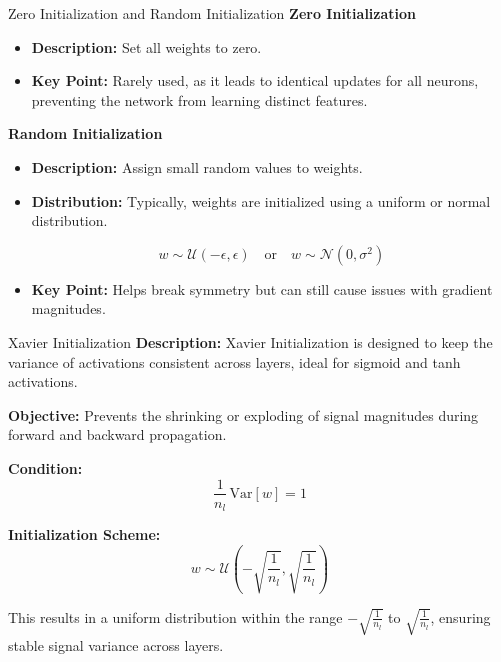 \documentclass[serif, aspectratio=169]{beamer}
\begin{document}
\begin{frame}{Zero Initialization and Random Initialization}
\textbf{Zero Initialization}
\begin{itemize}
     

   \item \textbf{Description:} Set all weights to zero.
    
   \item \textbf{Key Point:} Rarely used, as it leads to identical updates for all neurons, preventing the network from learning distinct features.
    \end{itemize}
    \textbf{Random Initialization}
\begin{itemize}
   \item \textbf{Description:} Assign small random values to weights.
    
    \item \textbf{Distribution:} Typically, weights are initialized using a uniform or normal distribution.
    
    \[
    w \sim \mathcal{U}(-\epsilon, \epsilon) \quad \text{or} \quad w \sim \mathcal{N}(0, \sigma^2)
    \]
    
   \item \textbf{Key Point:} Helps break symmetry but can still cause issues with gradient magnitudes.
   \end{itemize}
   
\end{frame}
\begin{frame}{Xavier Initialization}
    \textbf{Description:} 
    Xavier Initialization is designed to keep the variance of activations consistent across layers, ideal for sigmoid and tanh activations.

    \textbf{Objective:} 
    Prevents the shrinking or exploding of signal magnitudes during forward and backward propagation.

    \textbf{Condition:}
    \[
    \frac{1}{n_l} \, \text{Var}[w] = 1
    \]

    \textbf{Initialization Scheme:}
    \[
    w \sim \mathcal{U}\left(-\sqrt{\frac{1}{n_l}}, \sqrt{\frac{1}{n_l}}\right)
    \]

    This results in a uniform distribution within the range \(-\sqrt{\frac{1}{n_l}}\) to \(\sqrt{\frac{1}{n_l}}\), ensuring stable signal variance across layers.
\end{frame}
\end{document}

